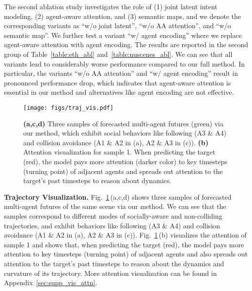 \documentclass[10pt,twocolumn,letterpaper]{article}
\begin{document}
The second ablation study investigates the role of (1) joint latent intent modeling, (2) agent-aware attention, and (3) semantic maps, and we denote the corresponding variants as ``w/o joint latent'', ``w/o AA attention'', and ``w/o semantic map''. We further test a variant ``w/ agent encoding'' where we replace agent-aware attention with agent encoding. The results are reported in the second group of Table~\ref{table:eth_abl} and~\ref{table:nuscenes_abl}. We can see that all variants lead to considerably worse performance compared to our full method. In particular, the variants ``w/o AA attention'' and ``w/ agent encoding'' result in pronounced performance drop, which indicates that agent-aware attention is essential in our method and alternatives like agent encoding are not effective.



\begin{figure}
    \centering
    \texttt{[image: figs/traj\_vis.pdf]}
    \caption{\textbf{(a,c,d)} Three samples of forecasted multi-agent futures (green) via our method, which exhibit social behaviors like following (A3 \& A4) and collision avoidance (A1 \& A2 in (a), A2 \& A3 in (c)). \textbf{(b)} Attention visualization for sample 1. When predicting the target (red), the model pays more attention (darker color) to key timesteps (turning point) of adjacent agents and spreads out attention to the target's past timesteps to reason about dynamics.}
    \label{fig:vis}
    \vspace{-3mm}
\end{figure}

\vspace{2mm}
\noindent\textbf{Trajectory Visualization.}
Fig.~\ref{fig:vis}\,(a,c,d) shows three samples of forecasted multi-agent futures of the same scene via our method. We can see that the samples correspond to different modes of socially-aware and non-colliding trajectories, and exhibit behaviors like following (A3 \& A4) and collision avoidance (A1 \& A2 in (a), A2 \& A3 in (c)). Fig.~\ref{fig:vis}\,(b) visualizes the attention of sample 1 and shows that, when predicting the target (red), the model pays more attention to key timesteps (turning point) of adjacent agents and also spreads out attention to the target's past timesteps to reason about the dynamics and curvature of its trajectory. More attention visualization can be found in Appendix~\ref{sec:supp_vis_attn}.
\end{document}

